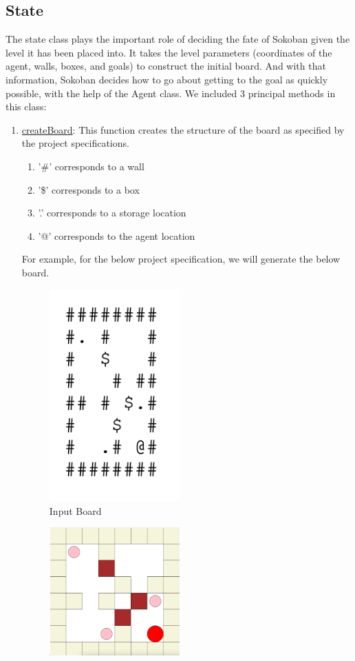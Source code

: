 \documentclass{article}
\begin{document}
\subsection{State}
The state class plays the important role of deciding the fate of Sokoban given the level it has been placed into. It takes the level parameters (coordinates of the agent, walls, boxes, and goals) to construct the initial board. And with that information, Sokoban decides how to go about getting to the goal as quickly possible, with the help of the Agent class. We included 3 principal methods in this class: 

\begin{enumerate}[label=\alph*)]
    \item \underline{createBoard}: This function creates the structure of the board as specified by the project specifications. 
    \begin{enumerate}
        \item '\#' corresponds to a wall
        \item '\$' corresponds to a box
        \item '.' corresponds to a storage location
        \item '@' corresponds to the agent location
    \end{enumerate}
    For example, for the below project specification, we will generate the below board.  
    \begin{figure}[htp]
        \centering
        \includegraphics[width=5cm]{Input.png}
        \caption{Input Board}
    \end{figure} 
    \begin{figure}[htp]
        \centering
        \includegraphics[width=5cm]{Board.png}

\end{figure}
\end{enumerate}
\end{document}
